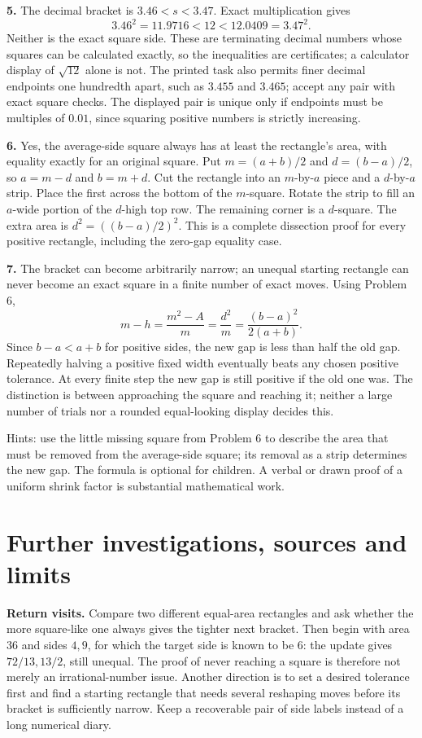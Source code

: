 \documentclass[11pt,letterpaper]{article}
\begin{document}
\textbf{5.} The decimal bracket is $3.46<s<3.47$. Exact multiplication gives
\[3.46^2=11.9716<12<12.0409=3.47^2.\]
Neither is the exact square side. These are terminating decimal numbers whose squares can be calculated exactly, so the inequalities are certificates; a calculator display of $\sqrt{12}$ alone is not. The printed task also permits finer decimal endpoints one hundredth apart, such as $3.455$ and $3.465$; accept any pair with exact square checks. The displayed pair is unique only if endpoints must be multiples of $0.01$, since squaring positive numbers is strictly increasing.

\textbf{6.} Yes, the average-side square always has at least the rectangle's area, with equality exactly for an original square. Put $m=(a+b)/2$ and $d=(b-a)/2$, so $a=m-d$ and $b=m+d$. Cut the rectangle into an $m$-by-$a$ piece and a $d$-by-$a$ strip. Place the first across the bottom of the $m$-square. Rotate the strip to fill an $a$-wide portion of the $d$-high top row. The remaining corner is a $d$-square. The extra area is $d^2=((b-a)/2)^2$. This is a complete dissection proof for every positive rectangle, including the zero-gap equality case.

\textbf{7.} The bracket can become arbitrarily narrow; an unequal starting rectangle can never become an exact square in a finite number of exact moves. Using Problem 6,
\[m-h=\frac{m^2-A}{m}=\frac{d^2}{m}=\frac{(b-a)^2}{2(a+b)}.\]
Since $b-a<a+b$ for positive sides, the new gap is less than half the old gap. Repeatedly halving a positive fixed width eventually beats any chosen positive tolerance. At every finite step the new gap is still positive if the old one was. The distinction is between approaching the square and reaching it; neither a large number of trials nor a rounded equal-looking display decides this.

Hints: use the little missing square from Problem 6 to describe the area that must be removed from the average-side square; its removal as a strip determines the new gap. The formula is optional for children. A verbal or drawn proof of a uniform shrink factor is substantial mathematical work.
\newpage
\section*{Further investigations, sources and limits}
\textbf{Return visits.} Compare two different equal-area rectangles and ask whether the more square-like one always gives the tighter next bracket. Then begin with area $36$ and sides $4,9$, for which the target side is known to be $6$: the update gives $72/13,13/2$, still unequal. The proof of never reaching a square is therefore not merely an irrational-number issue. Another direction is to set a desired tolerance first and find a starting rectangle that needs several reshaping moves before its bracket is sufficiently narrow. Keep a recoverable pair of side labels instead of a long numerical diary.
\end{document}
